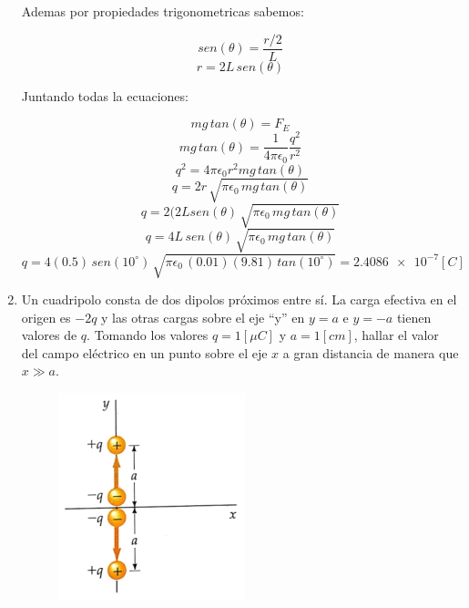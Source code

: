 \documentclass[letter,11pt]{article}
\begin{document}
\begin{enumerate}
Ademas por propiedades trigonometricas sabemos:

\begin{equation*}
    sen(\theta) = \frac{r/2}{L}
\end{equation*}
\begin{equation*}
    r = 2L\,sen(\theta)
\end{equation*}

Juntando todas la ecuaciones:

\begin{equation*}
    mg\,tan(\theta) = F_E
\end{equation*}
\begin{equation*}
    mg\,tan(\theta) = \frac{1}{4\pi\epsilon_0}\frac{q^2}{r^2}
\end{equation*}
\begin{equation*}
    q^2 = 4\pi\epsilon_0 r^2 mg\,tan(\theta)
\end{equation*}
\begin{equation*}
    q = 2r\,\sqrt{\pi\epsilon_0\,mg\,tan(\theta)}
\end{equation*}
\begin{equation*}
    q = 2(2L sen(\theta)\,\sqrt{\pi\epsilon_0\,mg\,tan(\theta)}
\end{equation*}
\begin{equation*}
    q = 4L\,sen(\theta)\,\sqrt{\pi\epsilon_0\,mg\,tan(\theta)}
\end{equation*}
\begin{equation*}
    q = 4(0.5)\,sen(10^\circ)\,\sqrt{\pi\epsilon_0\,(0.01)(9.81)\,tan(10^\circ)}
      = \num{2.4086e-7} [C]
\end{equation*}

\item Un cuadripolo consta de dos dipolos próximos entre sí. La carga efectiva
en el origen es $-2q$ y las otras cargas sobre el eje ``y'' en $y = a$ e
$y = -a$ tienen valores de $q$. Tomando los valores $q = 1 [\mu C]$ y
$a = 1 [cm]$, hallar el valor del campo eléctrico en un punto sobre el eje $x$ a
gran distancia de manera que $x \gg a$.

\begin{figure}[!h]
\centering
\includegraphics[scale=2.20]{resources/q2.eps}
\end{figure}


\end{enumerate}
\end{document}
